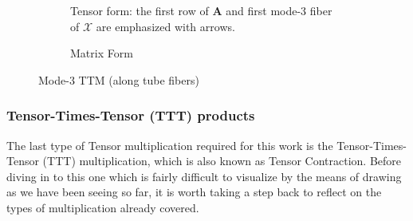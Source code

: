         \begin{figure}
            \centering
            
            \begin{subfigure}[b]{0.99\textwidth}
                \centering
                
                \caption[Mode 2 TTM Tensor Format]{Tensor form: the first row of $\mathbf{A}$ and first mode-3 fiber of $\mathcal{X}$ are emphasized with arrows.}
                \label{fig:mode3_ttm_tensor_format}
            \end{subfigure}
            
            \vspace{1em}
            
            \begin{subfigure}[b]{0.99\textwidth}
                \centering
                
                \caption[Mode 3 TTM Tensor Format]{Matrix Form}
                \label{fig:mode3_ttm_matrix_format}
            \end{subfigure}

            \caption[Mode-3 TTM]{Mode-3 TTM (along tube fibers)}
            \label{fig:Mode-3_TTM}
        \end{figure}

    
    \subsubsection{Tensor-Times-Tensor (TTT) products} \label{sec:Tensor-Times-Tensor Products}
        The last type of Tensor multiplication required for this work is the
        Tensor-Times-Tensor (TTT) multiplication, which is also known as Tensor
        Contraction. Before diving in to this one which is fairly difficult to
        visualize by the means of drawing as we have been seeing so far, it is
        worth taking a step back to reflect on the types of multiplication
        already covered.

